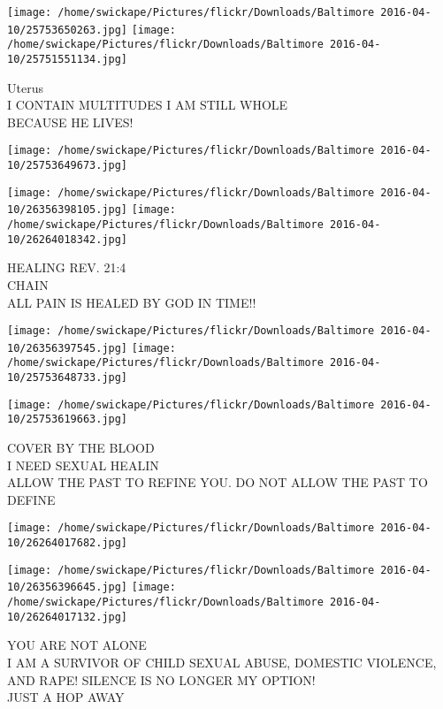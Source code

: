 \documentclass[10pt,letterpaper]{article}
\begin{document}
\vspace{0.25in}
\texttt{[image: /home/swickape/Pictures/flickr/Downloads/Baltimore 2016-04-10/25753650263.jpg]}
\texttt{[image: /home/swickape/Pictures/flickr/Downloads/Baltimore 2016-04-10/25751551134.jpg]}

Uterus\\
I CONTAIN MULTITUDES I AM STILL WHOLE\\
BECAUSE HE LIVES!
\pagebreak

\texttt{[image: /home/swickape/Pictures/flickr/Downloads/Baltimore 2016-04-10/25753649673.jpg]}

\vspace{0.25in}
\texttt{[image: /home/swickape/Pictures/flickr/Downloads/Baltimore 2016-04-10/26356398105.jpg]}
\texttt{[image: /home/swickape/Pictures/flickr/Downloads/Baltimore 2016-04-10/26264018342.jpg]}

HEALING REV. 21:4\\
CHAIN\\
ALL PAIN IS HEALED BY GOD IN TIME!!
\pagebreak

\texttt{[image: /home/swickape/Pictures/flickr/Downloads/Baltimore 2016-04-10/26356397545.jpg]}
\texttt{[image: /home/swickape/Pictures/flickr/Downloads/Baltimore 2016-04-10/25753648733.jpg]}

\vspace{0.25in}
\texttt{[image: /home/swickape/Pictures/flickr/Downloads/Baltimore 2016-04-10/25753619663.jpg]}

COVER BY THE BLOOD\\
I NEED SEXUAL HEALIN\\
ALLOW THE PAST TO REFINE YOU.  DO NOT ALLOW THE PAST TO DEFINE
\pagebreak

\texttt{[image: /home/swickape/Pictures/flickr/Downloads/Baltimore 2016-04-10/26264017682.jpg]}

\vspace{0.25in}
\texttt{[image: /home/swickape/Pictures/flickr/Downloads/Baltimore 2016-04-10/26356396645.jpg]}
\texttt{[image: /home/swickape/Pictures/flickr/Downloads/Baltimore 2016-04-10/26264017132.jpg]}

YOU ARE NOT ALONE\\
I AM A SURVIVOR OF CHILD SEXUAL ABUSE, DOMESTIC VIOLENCE, AND RAPE!  SILENCE IS NO LONGER MY OPTION!\\
JUST A HOP AWAY
\pagebreak
\end{document}
